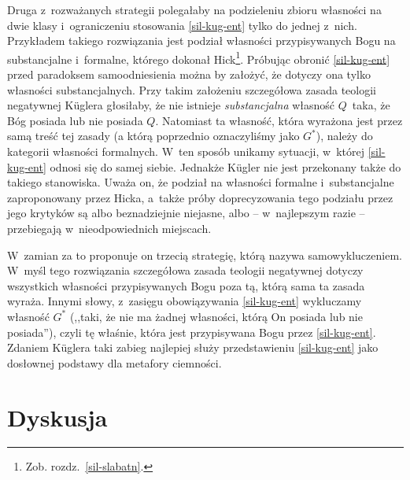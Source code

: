 Druga z~rozważanych strategii polegałaby na podzieleniu zbioru własności na dwie klasy i~ograniczeniu stosowania \ref{sil-kug-ent} tylko do jednej z~nich. Przykładem takiego rozwiązania jest podział własności przypisywanych Bogu na substancjalne i~formalne, którego dokonał Hick\footnote{Zob. rozdz.~\ref{sil-slabatn}.}. Próbując obronić \ref{sil-kug-ent} przed paradoksem samoodniesienia można by założyć, że dotyczy ona tylko własności substancjalnych. Przy takim założeniu szczegółowa zasada teologii negatywnej Küglera głosiłaby, że nie istnieje \textit{substancjalna} własność $Q$~taka, że Bóg posiada lub nie posiada $Q$. Natomiast ta własność, która wyrażona jest przez samą treść tej zasady (a którą poprzednio oznaczyliśmy jako $G^*$), należy do kategorii własności formalnych. W~ten sposób unikamy sytuacji, w~której \ref{sil-kug-ent} odnosi się do samej siebie. Jednakże Kügler nie jest przekonany także do takiego stanowiska. Uważa on, że podział na własności formalne i~substancjalne zaproponowany przez Hicka, a~także próby doprecyzowania tego podziału przez jego krytyków są albo beznadziejnie niejasne, albo -- w~najlepszym razie -- przebiegają w~nieodpowiednich miejscach.

W~zamian za to proponuje on trzecią strategię, którą nazywa samowykluczeniem. W~myśl tego rozwiązania szczegółowa zasada teologii negatywnej dotyczy wszystkich własności przypisywanych Bogu poza tą, którą sama ta zasada wyraża. Innymi słowy, z~zasięgu obowiązywania \ref{sil-kug-ent} wykluczamy własność $G^*$ (,,taki, że nie ma żadnej własności, którą On posiada lub nie posiada''), czyli tę właśnie, która jest przypisywana Bogu przez \ref{sil-kug-ent}. Zdaniem Küglera taki zabieg najlepiej służy przedstawieniu \ref{sil-kug-ent} jako dosłownej podstawy dla metafory ciemności.


\section{Dyskusja}\label{sil-kug-dyskusja}

